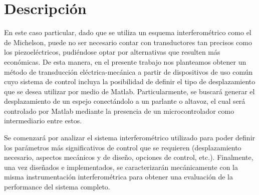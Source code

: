 \section{Descripción}
\label{sec:descrip}
En este caso particular, dado que se utiliza un esquema interferométrico como el de Michelson, puede no ser necesario contar con transductores tan precisos como los piezoeléctricos, pudiéndose optar por alternativas que resulten más económicas.
De esta manera, en el presente trabajo nos planteamos obtener un método de transducción eléctrica-mecánica a partir de dispositivos de uso común cuyo sistema de control incluya la posibilidad de definir el tipo de desplazamiento que se desea utilizar por medio de Matlab. Particularmente, se buscará generar el desplazamiento de un espejo conectándolo a un parlante o altavoz, el cual será controlado por Matlab mediante la presencia de un microcontrolador como intermediario entre estos.

Se comenzará por analizar el sistema interferométrico utilizado para poder definir los parámetros más significativos de control que se requieren (desplazamiento necesario, aspectos mecánicos y de diseño, opciones de control, etc.). Finalmente, una vez diseñados e implementados, se caracterizarán mecánicamente con la misma instrumentación interferométrica para obtener una evaluación de la performance del sistema completo.
